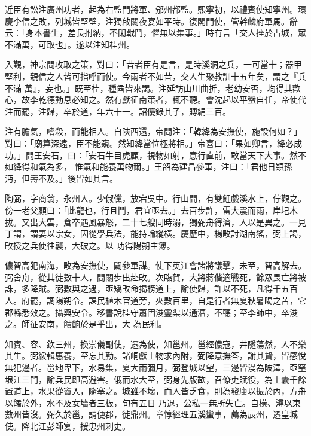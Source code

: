 \begin{pinyinscope}
 近臣有訟注廣州功者，起為右監門將軍、邠州都監。熙寧初，以禮賓使知寧州。環慶李信之敗，列城皆堅壁，注獨啟關夜宴如平時。復閣門使，管幹麟府軍馬。辭云：「身本書生，差長拊納，不閑戰鬥，懼無以集事。」時有言「交人挫於占城，眾不滿萬，可取也」。遂以注知桂州。



 入覲，神宗問攻取之策，對曰：「昔者臣有是言，是時溪洞之兵，一可當十；器甲堅利，親信之人皆可指呼而使。今兩者不如昔，交人生聚教訓十五年矣，謂之『兵不滿
 萬』，妄也。」既至桂，種酋皆來謁。注延訪山川曲折，老幼安否，均得其歡心，故李乾德動息必知之。然有獻征南策者，輒不聽。會沈起以平蠻自任，帝使代注而罷，注歸，卒於道，年六十一。詔優錄其子，賻絹三百。



 注有膽氣，嗜殺，而能相人。自陜西還，帝問注：「韓絳為安撫使，施設何如？」對曰：「廟算深遠，臣不能窺。然知絳當位極將相。」帝喜曰：「果如卿言，絳必成功。」問王安石，曰：「安石牛目虎顧，視物如射，意行直前，敢當天下大事。然不如絳得和氣為多，
 惟氣和能養萬物爾。」王韶為建昌參軍，注曰：「君他日類孫沔，但壽不及。」後皆如其言。



 陶弼，字商翁，永州人。少俶儻，放宕吳中。行山間，有雙鯉戲溪水上，佇觀之。傍一老父顧曰：「此龍也，行且鬥，君宜亟去。」去百步許，雷大震而雨，岸圮木拔。又出大雲，倉卒遇風暴怒，二十七艘同時溺，獨弼舟得濟，人以是異之。一見丁謂，謂妻以宗女，因從學兵法，能持論縱橫。慶歷中，楊畋討湖南猺，弼上謁，畋授之兵使往襲，大破之。以
 功得陽朔主簿。



 儂智高犯南海，畋為安撫使，闢參軍謀。使下英江會諸將議擊，未至，智高解去。弼舍舟，從其徒數十人，間關步出赴畋。次臨賀，大將蔣偕適戰死，餘眾畏亡將被誅，多降賊。弼數與之遇，亟矯畋命揭榜道上，諭使歸，許以不死，凡得千五百人。府罷，調陽朔令。課民植木官道旁，夾數百里，自是行者無夏秋暑暍之苦，它郡縣悉效之。攝興安令。移書說桂守蕭固浚靈渠以通漕，不聽；至李師中，卒浚之。師征安南，饋餉於是乎出，大
 為民利。



 知賓、容、欽三州，換崇儀副使，遷為使，知邕州。邕經儂寇，井隧蕩然，人不樂其生。弼綏輯惠養，至忘其勤。諸峒獻土物求內附，弼降意撫答，謝其贄，皆感悅無犯邊者。邕地卑下，水易集，夏大雨彌月，弼登城以望，三邊皆漫為陂澤，亟窒垠江三門，諭兵民即高避害。俄而水大至，弼身先版歃，召僚吏賦役，為土囊千餘置道上，水果從竇入，隨塞之。城雖不壞，而人皆乏食，則為發廩以振於內，方舟以饁於外，水不及女墻者三板，旬有五日
 乃退，公私一無所失亡。自橫、潯以東數州皆沒。弼久於邕，請便郡，徙鼎州。章惇經理五溪蠻事，薦為辰州，遷皇城使。降北江彭師宴，授忠州刺史。




\end{pinyinscope}
